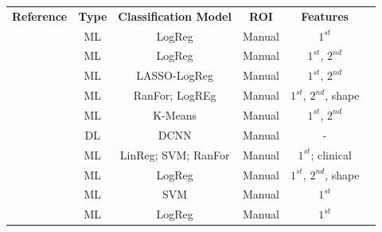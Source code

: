 \documentclass{article}
\begin{document}
\begin{table}[]
    \centering
    \begin{tabular}{cccccc}\toprule
        \multirow{2}{*}{\textbf{Reference}} & \multirow{2}{*}{\textbf{Type}} & \multirow{2}{*}{\textbf{Classification Model}} & \multirow{2}{*}{\textbf{ROI}} & \multirow{2}{*}{\textbf{Features}} \\
        \\\midrule
        \cite{Tu2018}                       & ML                             & LogReg                                         & Manual                        & $1^{st}$                           \\
        \cite{Yi20181}                      & ML                             & LogReg                                         & Manual                        & $1^{st}$, $2^{nd}$                 \\
        \cite{Yi2018}                       & ML                             & LASSO-LogReg                                   & Manual                        & $1^{st}$, $2^{nd}$                 \\
        \cite{Elmohr2019}                   & ML                             & RanFor; LogREg                                 & Manual                        & $1^{st}$, $2^{nd}$, shape          \\
        \cite{Torresan2021}                 & ML                             & K-Means                                        & Manual                        & $1^{st}$, $2^{nd}$                 \\
        \cite{Kusunoki2022}                 & DL                             & DCNN                                           & Manual                        & -                                  \\
        \cite{Liu2022}                      & ML                             & LinReg; SVM; RanFor                            & Manual                        & $1^{st}$; clinical                 \\
        \cite{Ho2019}                       & ML                             & LogReg                                         & Manual                        & $1^{st}$, $2^{nd}$, shape          \\
        \cite{Liu2021}                      & ML                             & SVM                                            & Manual                        & $1^{st}$                           \\
        \cite{Schieda2017}                  & ML                             & LogReg                                         & Manual                        & $1^{st}$                           \\

\end{tabular}
\end{table}
\end{document}
